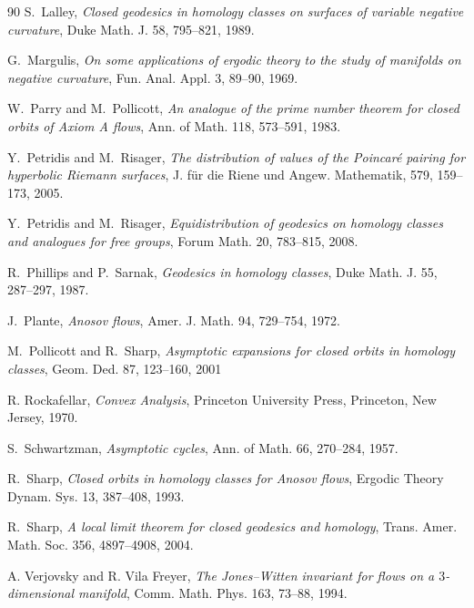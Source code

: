 \documentclass[11pt]{amsart}
\theoremstyle{definition}
\numberwithin{equation}{section}
\numberwithin{theorem}{section}
\begin{document}
\begin{thebibliography}{90}
S.~Lalley, 
\textit{Closed geodesics in homology classes on surfaces of variable negative curvature},
Duke Math. J. 58, 795--821, 1989.


G.~Margulis, \textit{On some applications of ergodic theory to the study of manifolds on negative 
curvature}, Fun. Anal. Appl. 3, 89--90, 1969.








W.~Parry and M.~Pollicott,
\emph{An analogue of the prime number theorem for closed orbits of Axiom A flows},
Ann. of Math. 118, 573--591, 1983.




Y.~Petridis and M.~Risager,
\emph{The distribution of values of the Poincar\'e pairing for hyperbolic Riemann
surfaces},
J. f\"ur die Riene und Angew. Mathematik, 579, 159--173, 2005.

Y.~Petridis and M.~Risager,
\emph{Equidistribution of geodesics on homology classes and analogues for free groups},
Forum Math. 20, 783--815, 2008.

R.~Phillips and P.~Sarnak,
\emph{Geodesics in homology classes},
Duke Math. J. 55, 287--297, 1987.

J.~Plante,
\emph{Anosov flows},
Amer. J. Math. 94, 729--754, 1972.  

M.~Pollicott and R.~Sharp,
\emph{Asymptotic expansions for closed orbits in homology classes}, 
Geom. Ded. 87, 123--160, 2001



R. Rockafellar,
\emph{Convex Analysis}, Princeton University Press, Princeton, New Jersey, 1970.

S.~Schwartzman,
\emph{Asymptotic cycles},
Ann. of Math. 66, 270--284, 1957.




R.~Sharp,
\emph{Closed orbits in homology classes for Anosov flows},
Ergodic Theory Dynam. Sys. 13, 387--408, 1993.

R.~Sharp,
\emph{A local limit theorem for closed geodesics and homology},
Trans. Amer. Math. Soc. 356, 4897--4908, 2004.




A. Verjovsky and R. Vila Freyer,
\emph{The Jones--Witten invariant for flows on a $3$-dimensional manifold},
Comm. Math. Phys. 163, 73--88, 1994.



\end{thebibliography}

 
 

 
\end{document}
